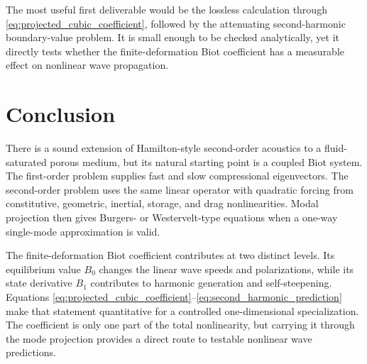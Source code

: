 \documentclass[11pt]{article}
\begin{document}
The most useful first deliverable would be the lossless calculation through
\eqref{eq:projected_cubic_coefficient}, followed by the attenuating
second-harmonic boundary-value problem.  It is small enough to be checked
analytically, yet it directly tests whether the finite-deformation Biot
coefficient has a measurable effect on nonlinear wave propagation.

\section{Conclusion}

There is a sound extension of Hamilton-style second-order acoustics to a
fluid-saturated porous medium, but its natural starting point is a coupled Biot
system.  The first-order problem supplies fast and slow compressional
eigenvectors.  The second-order problem uses the same linear operator with
quadratic forcing from constitutive, geometric, inertial, storage, and drag
nonlinearities.  Modal projection then gives Burgers- or Westervelt-type
equations when a one-way single-mode approximation is valid.

The finite-deformation Biot coefficient contributes at two distinct levels.
Its equilibrium value \(B_0\) changes the linear wave speeds and
polarizations, while its state derivative \(B_1\) contributes to harmonic
generation and self-steepening.  Equations
\eqref{eq:projected_cubic_coefficient}--\eqref{eq:second_harmonic_prediction}
make that statement quantitative for a controlled one-dimensional
specialization.  The coefficient is only one part of the total nonlinearity,
but carrying it through the mode projection provides a direct route to
testable nonlinear wave predictions.
\end{document}
